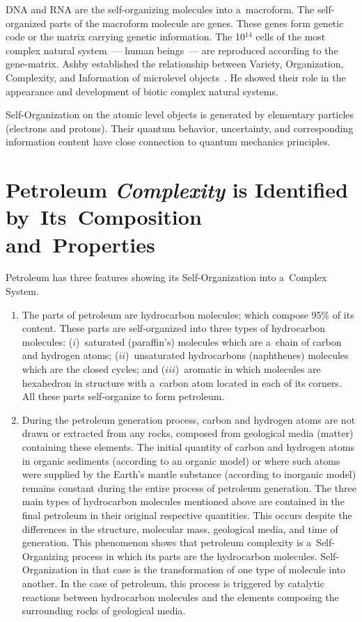 \begin{multicols}{2}
DNA and RNA are the self-organizing molecules into a~macroform. The self-organized parts of the 
macroform molecule are genes. These genes form genetic code or the matrix carrying genetic 
information. The 10$^{14}$ cells of the most complex natural system~--- human beings~--- are 
reproduced according to the gene-matrix. Ashby  established the relationship between Variety, 
Organization, Complexity, and Information of microlevel objects~\cite{18-sel}. He showed their role in 
the appearance and development of biotic complex natural systems.

Self-Organization on the atomic level objects is generated by elementary particles (electrons and 
protons). Their quantum behavior, uncertainty, and corresponding information content have close 
connection to quantum mechanics principles.
 
\section*{Petroleum \textit{Complexity} is Identified by~Its~Composition and~Properties }

\noindent
Petroleum has three features showing its Self-Organization into a~Complex System.
\begin{enumerate}[1.]
  \item  The parts of petroleum are hydrocarbon molecules; which compose 95\% of its 
content. These parts are self-organized into three types of hydrocarbon molecules: ($i$)~saturated 
(paraffin's) molecules which are a~chain of carbon and hydrogen atoms; ($ii$)~unsaturated 
hydrocarbons (naphthenes) molecules which are the closed cycles; and ($iii$)~aromatic in which 
molecules are hexahedron in structure with a~carbon atom located in each of its corners. All these 
parts self-organize to form petroleum. 
  
   \item During the petroleum generation process, carbon and hydrogen atoms 
   are not drawn or 
extracted from any rocks, composed from geological media (matter) containing these elements. 
The initial quantity of carbon and hydrogen atoms in organic sediments (according to an organic 
model) or where such atoms were supplied by the Earth's mantle substance (according to 
inorganic model) remains constant during the entire process of petroleum generation. The three 
main types of hydrocarbon molecules mentioned above are contained in the final petroleum in 
their original respective quantities. This occurs despite the differences in the structure, molecular 
mass, geological media, and time of generation. This phenomenon shows that petroleum 
complexity is a~Self-Organizing process in which its parts are the hydrocarbon molecules. 
Self-Organization in that case is the transformation of one type of molecule into another. In the case 
of petroleum, this process is triggered by catalytic reactions between hydrocarbon molecules and 
the elements composing the surrounding rocks of geological media.
  

\end{enumerate}
\end{multicols}
